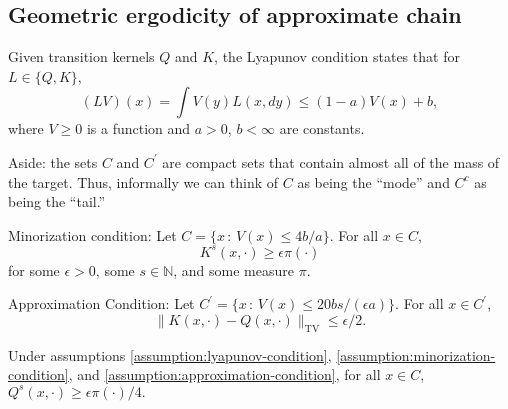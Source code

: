 \subsection{Geometric ergodicity of approximate chain}

\begin{assumption}
  Given transition kernels $Q$ and $K$, the Lyapunov condition states that for $L \in \{Q, K\}$, $$(LV)(x) = \int V(y) L(x, dy) \leq (1-a)V(x)+b,$$ where $V \geq 0$ is a function and $a>0$, $b<\infty$ are constants.
  \label{assumption:lyapunov-condition}
\end{assumption}

 Aside: the sets $C$ and $C^{\prime}$ are compact sets that contain almost all of the mass of the target. Thus, informally we can think of $C$ as being the ``mode'' and $C^{c}$ as being the ``tail.''

\begin{assumption}
  Minorization condition: Let $C = \{x \,:\, V(x) \leq 4b/a\}$.  For all $x \in C$, $$K^{s}(x,\cdot) \geq \epsilon \pi(\cdot)$$ for some $\epsilon > 0$, some $s \in \mathbb{N}$, and some measure $\pi$.
  \label{assumption:minorization-condition}
\end{assumption}

\begin{assumption}
  Approximation Condition: Let $C^{\prime} = \{x \,:\, V(x) \leq 20 b s/(\epsilon a) \}$. For all $x \in C^{\prime}$, $$\|K(x,\cdot) - Q(x,\cdot)\|_{\mathrm{TV}} \leq \epsilon/2.$$
  \label{assumption:approximation-condition}
\end{assumption}

\begin{lemma}
Under assumptions \ref{assumption:lyapunov-condition}, \ref{assumption:minorization-condition}, and \ref{assumption:approximation-condition}, for all $x \in C$, $Q^{s}(x,\cdot) \geq \epsilon \pi(\cdot) / 4.$
\end{lemma}

